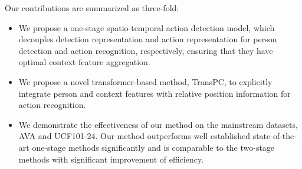 \documentclass[final]{cvpr}
\begin{document}
Our contributions are summarized as three-fold:
\begin{itemize}
\item We propose a one-stage spatio-temporal action detection model, which decouples detection representation and action representation for person detection and action recognition, respectively, ensuring that they have optimal context feature aggregation.
\vspace{-1mm}
\item We propose a novel transformer-based method, TransPC, to explicitly integrate person and context features with relative position information for action recognition.
\vspace{-1mm}
\item We demonstrate the effectiveness of our method on the mainstream datasets, AVA and UCF101-24. Our method outperforms well established state-of-the-art one-stage methods significantly and is comparable to the two-stage methods with significant improvement of efficiency.
\vspace{-3mm}
\end{itemize}

\end{document}
